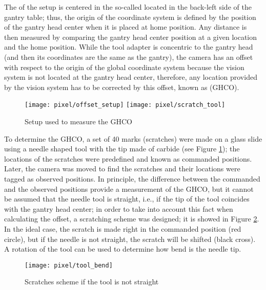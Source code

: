 The  of the setup is centered in the so-called  located in the back-left side of the gantry table; thus, the origin of the coordinate system is defined by the position of the gantry head center when it is placed at home position. Any distance is then measured by comparing the gantry head center position at a given location and the home position. While the tool adapter is concentric to the gantry head (and then its coordinates are the same as the gantry), the camera has an offset with respect to the origin of the global coordinate system because the vision system is not located at the gantry head center, therefore, any location provided by the vision system has to be corrected by this offset, known as  (GHCO).

\begin{figure}[h]
\begin{center}
\texttt{[image: pixel/offset\_setup]}
\texttt{[image: pixel/scratch\_tool]}
\caption{Setup used to measure the GHCO}\label{fig:offset_setup}
\end{center}
\end{figure}

To determine the GHCO, a set of 40 marks (scratches) were made on a glass slide using a needle shaped tool with the tip made of carbide (see Figure \ref{fig:offset_setup}); the locations of the scratches were predefined and known as commanded positions. Later, the camera was moved to find the scratches and their locations were tagged as observed positions. In principle, the difference between the commanded and the observed positions provide a measurement of the GHCO, but it cannot be assumed that the needle tool is straight, i.e., if the tip of the tool coincides with the gantry head center; in order to take into account this fact when calculating the offset, a scratching scheme was designed; it is showed in Figure \ref{tool_bend}. In the ideal case, the scratch is made right in the commanded position (red circle), but if the needle is not straight, the scratch will be shifted (black cross). A rotation of the tool can be used to determine how bend is the needle tip.

\begin{figure}[h]
\begin{center}
\texttt{[image: pixel/tool\_bend]}
\caption{Scratches scheme if the tool is not straight }\label{tool_bend}
\end{center}
\end{figure}

